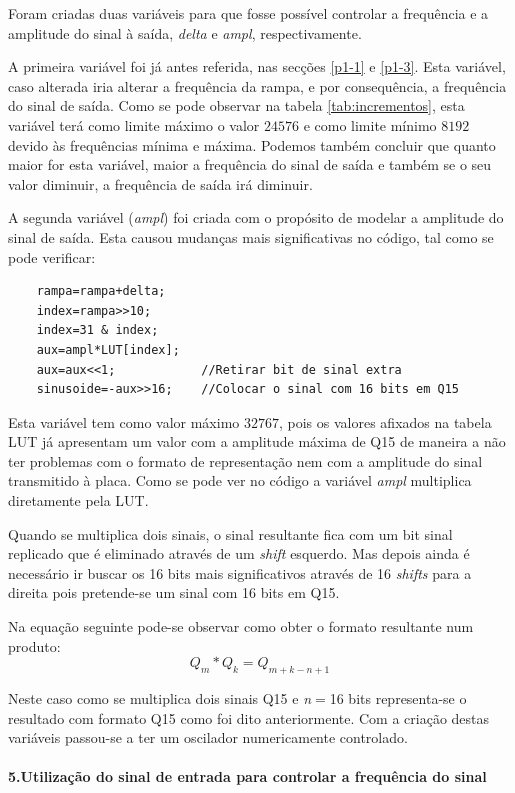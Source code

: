 \documentclass[11pt]{article}
\numberwithin{equation}{section}
\begin{document}
Foram criadas duas variáveis para que fosse possível controlar a frequência e a amplitude do sinal à saída, \textit{delta} e \textit{ampl}, respectivamente.

A primeira variável foi já antes referida, nas secções \ref{p1-1} e \ref{p1-3}. Esta variável, caso alterada iria alterar a frequência da rampa, e por consequência, a frequência do sinal de saída. Como se pode observar na tabela \ref{tab:incrementos}, esta variável terá como limite máximo o valor $ 24576 $ e como limite mínimo $ 8192 $ devido às frequências mínima e máxima. Podemos também concluir que quanto maior for esta variável, maior a frequência do sinal de saída e também se o seu valor diminuir, a frequência de saída irá diminuir.

A segunda variável (\textit{ampl}) foi criada com o propósito de modelar a amplitude do sinal de saída. Esta causou mudanças mais significativas no código, tal como se pode verificar:
\begin{lstlisting}
	rampa=rampa+delta;
	index=rampa>>10;
	index=31 & index;        
	aux=ampl*LUT[index];
	aux=aux<<1;            //Retirar bit de sinal extra
	sinusoide=-aux>>16;    //Colocar o sinal com 16 bits em Q15
\end{lstlisting}

Esta variável tem como valor máximo $ 32767 $, pois os valores afixados na tabela LUT já apresentam um valor com a amplitude máxima de Q15 de maneira a não ter problemas com o formato de representação nem com a amplitude do sinal transmitido à placa.
Como se pode ver no código a variável \textit{ampl} multiplica diretamente pela LUT. 
\vspace{2 mm}

Quando se multiplica dois sinais, o sinal resultante fica com um bit sinal replicado que é eliminado através de um \textit{shift} esquerdo. Mas depois ainda é necessário ir buscar os 16 bits mais significativos através de 16 \textit{shifts} para a direita pois pretende-se um sinal com 16 bits em Q15. 

Na equação seguinte pode-se observar como obter o formato resultante num produto:
\begin{equation}
Q_{m} * Q_{k}=Q_{m+k-n+1}
\end{equation}

Neste caso como se multiplica dois sinais Q15 e \textit{n}$=$16 bits representa-se o resultado com formato Q15 como foi dito anteriormente.
Com a criação destas variáveis passou-se a ter um oscilador numericamente controlado.
\paragraph{5.Utilização do sinal de entrada para controlar a frequência do sinal} \hspace{0pt}
\label{p1-5}
\end{document}
